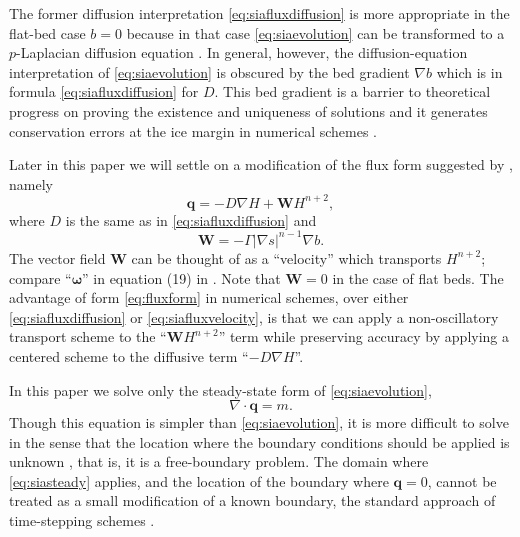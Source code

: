 \documentclass[twocolumn,letterpaper]{igs}
\newcommand\bq{\mathbf{q}}
\newcommand\bW{\mathbf{W}}
\newcommand{\Div}{\nabla\cdot}
\newcommand{\grad}{\nabla}
\begin{document}
The former diffusion interpretation \eqref{eq:siafluxdiffusion} is more appropriate in the flat-bed case $b=0$ because in that case \eqref{eq:siaevolution} can be transformed to a $p$-Laplacian diffusion equation \citep{Calvoetal2002}.  In general, however, the diffusion-equation interpretation of \eqref{eq:siaevolution} is obscured by the bed gradient $\grad b$ which is in formula \eqref{eq:siafluxdiffusion} for $D$.  This bed gradient is a barrier to theoretical progress on proving the existence and uniqueness of solutions \citep{JouvetBueler2012} and it generates conservation errors at the ice margin in numerical schemes \citep{JaroschSchoofAnslow2013}.

Later in this paper we will settle on a modification of the flux form suggested by \cite{JaroschSchoofAnslow2013}, namely
\begin{equation}
\bq = - D \grad H + \bW H^{n+2},\label{eq:fluxform}
\end{equation}
where $D$ is the same as in \eqref{eq:siafluxdiffusion} and
\begin{equation}
\bW = - \Gamma |\grad s|^{n-1} \grad b.  \label{eq:siaWdefine}
\end{equation}
The vector field $\bW$ can be thought of as a ``velocity'' which transports $H^{n+2}$; compare ``$\boldsymbol{\omega}$'' in equation (19) in \citep{JaroschSchoofAnslow2013}.  Note that $\bW=0$ in the case of flat beds.  The advantage of form \eqref{eq:fluxform} in numerical schemes, over either \eqref{eq:siafluxdiffusion} or \eqref{eq:siafluxvelocity}, is that we can apply a non-oscillatory transport scheme to the ``$\bW H^{n+2}$'' term while preserving accuracy by applying a centered scheme to the diffusive term ``$-D \grad H$''.

In this paper we solve only the steady-state form of \eqref{eq:siaevolution},
\begin{equation}
\Div \bq = m.  \label{eq:siasteady}
\end{equation}
Though this equation is simpler than \eqref{eq:siaevolution}, it is more difficult to solve in the sense that the location where the boundary conditions should be applied is unknown \citep{JaroschSchoofAnslow2013,JouvetBueler2012}, that is, it is a free-boundary problem.  The domain where \eqref{eq:siasteady} applies, and the location of the boundary where $\bq=0$, cannot be treated as a small modification of a known boundary, the standard approach of time-stepping schemes \citep{Bueleretal2005,Huybrechtsetal1996}.
\end{document}
